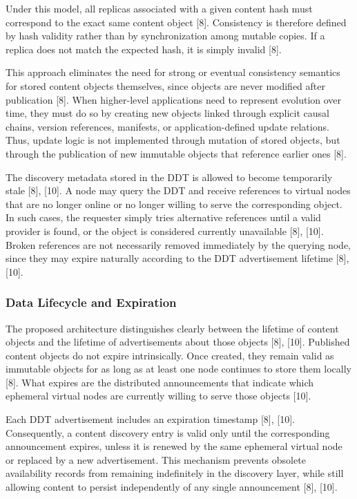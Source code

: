\documentclass[12pt,a4paper]{article}
\begin{document}
Under this model, all replicas associated with a given content hash must correspond to the exact same content object [8]. Consistency is therefore defined by hash validity rather than by synchronization among mutable copies. If a replica does not match the expected hash, it is simply invalid [8].

This approach eliminates the need for strong or eventual consistency semantics for stored content objects themselves, since objects are never modified after publication [8]. When higher-level applications need to represent evolution over time, they must do so by creating new objects linked through explicit causal chains, version references, manifests, or application-defined update relations. Thus, update logic is not implemented through mutation of stored objects, but through the publication of new immutable objects that reference earlier ones [8].

The discovery metadata stored in the DDT is allowed to become temporarily stale [8], [10]. A node may query the DDT and receive references to virtual nodes that are no longer online or no longer willing to serve the corresponding object. In such cases, the requester simply tries alternative references until a valid provider is found, or the object is considered currently unavailable [8], [10]. Broken references are not necessarily removed immediately by the querying node, since they may expire naturally according to the DDT advertisement lifetime [8], [10].

\subsubsection{Data Lifecycle and Expiration}

The proposed architecture distinguishes clearly between the lifetime of content objects and the lifetime of advertisements about those objects [8], [10]. Published content objects do not expire intrinsically. Once created, they remain valid as immutable objects for as long as at least one node continues to store them locally [8]. What expires are the distributed announcements that indicate which ephemeral virtual nodes are currently willing to serve those objects [10].

Each DDT advertisement includes an expiration timestamp [8], [10]. Consequently, a content discovery entry is valid only until the corresponding announcement expires, unless it is renewed by the same ephemeral virtual node or replaced by a new advertisement. This mechanism prevents obsolete availability records from remaining indefinitely in the discovery layer, while still allowing content to persist independently of any single announcement [8], [10].
\end{document}
